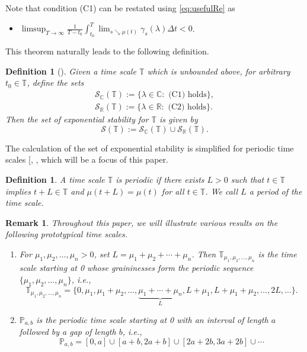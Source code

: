 \documentclass[10pt,a4paper]{amsart}
\numberwithin{equation}{section}
\newtheorem{definition}[theorem]{Definition}
\newtheorem{remark}[theorem]{Remark}
\begin{document}
Note that condition (C1) can be restated using \eqref{eq:usefulRe} as
\begin{itemize}
\item[(C1*)] $ \limsup_{T \to
\infty}\frac{1}{T-t_0}\int_{t_0}^{T}\lim_{s \searrow
\mu(t)} \gamma_s(\lambda) \Delta t <0$.
\end{itemize}
This theorem naturally leads to the following definition.

\begin{definition}[\cite{PoSiWi}] \rm
Given a time scale $\mathbb{T}$ which is unbounded above, for
arbitrary $t_0 \in \mathbb{T}$, define the sets
 \begin{gather*}
 \mathcal{S}_{\mathbb{C}}(\mathbb{T}):=\{\lambda \in \mathbb{C}: \text{ (C1) holds}\},\\
 \mathcal{S}_{\mathbb{R}}(\mathbb{T}):=\{\lambda \in \mathbb{R}: \text{ (C2) holds}\}.
 \end{gather*}
Then the \emph{set of exponential stability} for $\mathbb{T}$ is given by
$$
\mathcal{S}(\mathbb{T}):=\mathcal{S}_{\mathbb{C}}(\mathbb{T}) \cup \mathcal{S}_{\mathbb{R}}(\mathbb{T}).
$$
\end{definition}

The calculation of the set of exponential stability is simplified for periodic
time scales [\cite[Lemma~3.4(b)]{PoSiWi}, , which will be a focus of this paper.

\begin{definition} \rm
 A time scale $\mathbb{T}$ is \emph{periodic} if there exists $L>0$ such that
 $t \in \mathbb{T}$ implies $t+L \in \mathbb{T}$ and $\mu(t+L)=\mu(t)$ for all $t \in \mathbb{T}$.
We call $L$ a \emph{period} of the time scale.
\end{definition}


\begin{remark} \rm
Throughout this paper, we will illustrate various results on the following
prototypical time scales.
 \begin{enumerate}
 \item For $\mu_1,\mu_2,\dots,\mu_n>0$, set $L=\mu_1+\mu_2+\cdots+\mu_n$.
 Then $\mathbb{T}_{\mu_1,\mu_2,\dots,\mu_n}$ is the time scale starting at 0 whose
 graininesses form the periodic sequence $\{\mu_1,\mu_2,\dots,\mu_n\}$, i.e.,
 $$
 \mathbb{T}_{\mu_1,\mu_2,\dots,\mu_n}
 =\Big\{0,\mu_1,\mu_1+\mu_2,\dots,\underbrace{\mu_1+\cdots+\mu_n}_{L},
 L+\mu_1,L+\mu_1+\mu_2,\dots,2L,\dots\Big\}.
 $$

 \item $\mathbb{P}_{a,b}$ is the periodic time scale starting at 0 with an
 interval of length $a$ followed by a gap of length $b$, i.e.,
 $$
 \mathbb{P}_{a,b}=[0,a]\cup[a+b,2a+b]\cup[2a+2b,3a+2b]\cup\cdots
 $$
\end{enumerate}
\end{remark}
\end{document}
